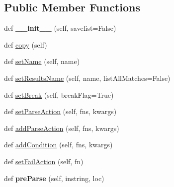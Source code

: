 \subsection*{Public Member Functions}
\begin{DoxyCompactItemize}
\item 
\mbox{\label{classsetuptools_1_1__vendor_1_1pyparsing_1_1_parser_element_ab84851b66a664b165f782ec593458782}} 
def {\bfseries \+\_\+\+\_\+init\+\_\+\+\_\+} (self, savelist=False)
\item 
def \hyperlink{classsetuptools_1_1__vendor_1_1pyparsing_1_1_parser_element_a8bb074071dc9fc5f473a5e93459b8ddb}{copy} (self)
\item 
def \hyperlink{classsetuptools_1_1__vendor_1_1pyparsing_1_1_parser_element_ab346e0dc4858607df91e45997f921727}{set\+Name} (self, name)
\item 
def \hyperlink{classsetuptools_1_1__vendor_1_1pyparsing_1_1_parser_element_a3c4dc5305a3369fad37fc46442079a69}{set\+Results\+Name} (self, name, list\+All\+Matches=False)
\item 
def \hyperlink{classsetuptools_1_1__vendor_1_1pyparsing_1_1_parser_element_a1f7a4070fece9d0194863d4dc41cd830}{set\+Break} (self, break\+Flag=True)
\item 
def \hyperlink{classsetuptools_1_1__vendor_1_1pyparsing_1_1_parser_element_aeb240cc333ab3c73d5955f00b2dbf1e4}{set\+Parse\+Action} (self, fns, kwargs)
\item 
def \hyperlink{classsetuptools_1_1__vendor_1_1pyparsing_1_1_parser_element_a350ff60fb199c182d996530bc63166f5}{add\+Parse\+Action} (self, fns, kwargs)
\item 
def \hyperlink{classsetuptools_1_1__vendor_1_1pyparsing_1_1_parser_element_a6ade32202c2ff37b7466d8cf13efa000}{add\+Condition} (self, fns, kwargs)
\item 
def \hyperlink{classsetuptools_1_1__vendor_1_1pyparsing_1_1_parser_element_a44066b87aa19c3aaa008d0a7bda1cc6d}{set\+Fail\+Action} (self, fn)
\item 
\mbox{\label{classsetuptools_1_1__vendor_1_1pyparsing_1_1_parser_element_a57915fb94be663017a485d39ebfa08eb}} 
def {\bfseries pre\+Parse} (self, instring, loc)
\item 
\mbox{\label{classsetuptools_1_1__vendor_1_1pyparsing_1_1_parser_element_a142fa33eac24d4ca11afd6f0d86bf547}} 

\end{DoxyCompactItemize}
